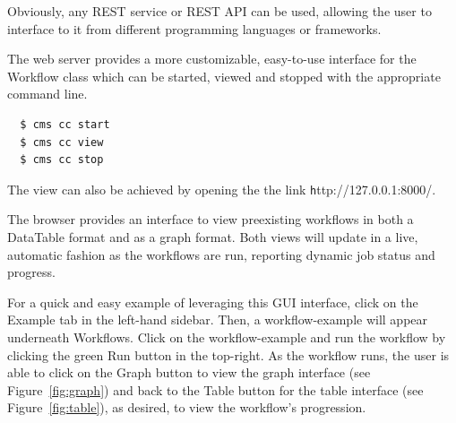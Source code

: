 Obviously, any REST service or REST API can be used, allowing the user to
interface to it from different programming languages or frameworks.

The web server provides a more customizable, easy-to-use interface for
the Workflow class which can be started, viewed and stopped with the
appropriate command line. 

\begin{verbatim}
  $ cms cc start
  $ cms cc view
  $ cms cc stop
\end{verbatim}

The view can also be achieved by opening the 
the link {\scriptsize\texttt http://127.0.0.1:8000/}.

The browser provides an interface to view preexisting workflows in both
a DataTable format and as a graph format. Both views will update
in a live, automatic fashion as the workflows are run, reporting
dynamic job status and progress.

For a quick and easy example of leveraging this GUI interface, click
on the Example tab in the left-hand sidebar. Then, a workflow-example
will appear underneath Workflows. Click on the workflow-example and
run the workflow by clicking the green Run button in the top-right. As
the workflow runs, the user is able to click on the Graph button
to view the graph interface (see Figure~\ref{fig:graph}) and back to the
Table button for the table interface (see Figure~\ref{fig:table}), as
desired, to view the workflow's progression.



